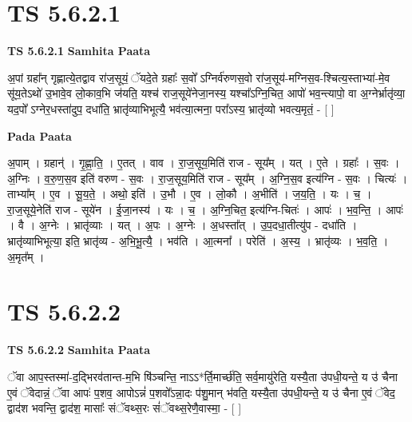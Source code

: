 \documentclass[17pt]{extarticle}
\begin{document}
\section*{ TS 5.6.2.1 }

\textbf{TS 5.6.2.1 } \newline
\textbf{Samhita Paata} \newline

अ॒पां ग्रहा᳚न् गृह्णात्ये॒तद्वाव रा॑ज॒सूयं॒ ॅयदे॒ते ग्रहाः᳚ स॒वो᳚ ऽग्निर्व॑रुणस॒वो रा॑ज॒सूय॑-मग्निस॒व-श्चित्य॒स्ताभ्या॑-मे॒व सू॑य॒तेऽथो॑ उ॒भावे॒व लो॒काव॒भि ज॑यति॒ यश्च॑ राज॒सूये॑नेजा॒नस्य॒ यश्चा᳚ऽग्नि॒चित॒ आपो॑ भव॒न्त्यापो॒ वा अ॒ग्नेर्भ्रातृ॑व्या॒ यद॒पो᳚ ऽग्नेर॒धस्ता॑दुप॒ दधा॑ति॒ भ्रातृ॑व्याभिभूत्यै॒ भव॑त्या॒त्मना॒ परा᳚ऽस्य॒ भ्रातृ॑व्यो भवत्य॒मृतं॒ - [  ] \newline

\textbf{Pada Paata} \newline

अ॒पाम् । ग्रहान्॑ । गृ॒ह्णा॒ति॒ । ए॒तत् । वाव । रा॒ज॒सूय॒मिति॑ राज - सूय᳚म् । यत् । ए॒ते । ग्रहाः᳚ । स॒वः । अ॒ग्निः । व॒रु॒ण॒स॒व इति॑ वरुण - स॒वः । रा॒ज॒सूय॒मिति॑ राज - सूय᳚म् । अ॒ग्नि॒स॒व इत्य॑ग्नि - स॒वः । चित्यः॑ । ताभ्या᳚म् । ए॒व । सू॒य॒ते॒ । अथो॒ इति॑ । उ॒भौ । ए॒व । लो॒कौ । अ॒भीति॑ । ज॒य॒ति॒ । यः । च॒ । रा॒ज॒सूये॒नेति॑ राज - सूये॑न । ई॒जा॒नस्य॑ । यः । च॒ । अ॒ग्नि॒चित॒ इत्य॑ग्नि-चितः॑ । आपः॑ । भ॒व॒न्ति॒ । आपः॑ । वै । अ॒ग्नेः । भ्रातृ॑व्याः । यत् । अ॒पः । अ॒ग्नेः । अ॒धस्ता᳚त् । उ॒प॒दधा॒तीत्यु॑प - दधा॑ति । भ्रातृ॑व्याभिभूत्या॒ इति॒ भ्रातृ॑व्य - अ॒भि॒भू॒त्यै॒ । भव॑ति । आ॒त्मना᳚ । परेति॑ । अ॒स्य॒ । भ्रातृ॑व्यः । भ॒व॒ति॒ । अ॒मृत᳚म् ।  \newline




\section*{ TS 5.6.2.2 }

\textbf{TS 5.6.2.2 } \newline
\textbf{Samhita Paata} \newline

ॅवा आप॒स्तस्मा॑-द॒द्भिरव॑तान्त-म॒भि षि॑ञ्चन्ति॒ नाऽऽ*र्ति॒मार्च्छ॑ति॒ सर्व॒मायु॑रेति॒ यस्यै॒ता उ॑पधी॒यन्ते॒ य उ॑ चैना ए॒वं ॅवेदान्नं॒ ॅवा आपः॑ प॒शव॒ आपोऽन्नं॑ प॒शवो᳚ऽन्ना॒दः प॑शु॒मान् भ॑वति॒ यस्यै॒ता उ॑पधी॒यन्ते॒ य उ॑ चैना ए॒वं ॅवेद॒ द्वाद॑श भवन्ति॒ द्वाद॑श॒ मासाः᳚ संॅवथ्स॒रः सं॑ॅवथ्स॒रेणै॒वास्मा॒ - [  ] \newline
\end{document}
